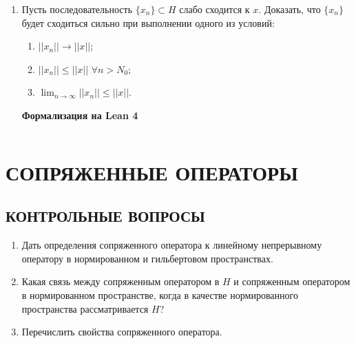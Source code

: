 \documentclass[12pt,a4paper]{article}
\begin{document}
\begin{enumerate}
\newpage
\item Пусть последовательность $\{x_{n}\} \subset H$ слабо сходится к $x$. Доказать, что $\{x_{n}\}$ будет сходиться сильно при выполнении одного из условий:
\begin{enumerate}[label=\alph*)]
\item $||x_{n}|| \rightarrow ||x||$;
\item $||x_{n}|| \le ||x||$ $\forall n > N_{0}$;
\item $\lim_{n \rightarrow \infty} ||x_{n}|| \le ||x||$.
\end{enumerate}

\begin{center}\small\textbf{Формализация на Lean 4}\end{center}
\inputminted{lean}{FunAn/Section17_HahnBanach/Task10.lean}

\end{enumerate}

\section{СОПРЯЖЕННЫЕ ОПЕРАТОРЫ}

\subsection*{КОНТРОЛЬНЫЕ ВОПРОСЫ}
\begin{enumerate}
\item Дать определения сопряженного оператора к линейному непрерывному оператору в нормированном и гильбертовом пространствах.
\item Какая связь между сопряженным оператором в $H$ и сопряженным оператором в нормированном пространстве, когда в качестве нормированного пространства рассматривается $H$?
\item Перечислить свойства сопряженного оператора.
\end{enumerate}
\end{document}
